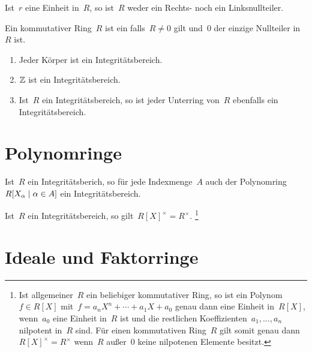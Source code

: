 \begin{proposition}
  Ist~$r$ eine Einheit in~$R$, so ist~$R$ weder ein Rechts- noch ein Linksnullteiler.
\end{proposition}

\begin{definition}
  Ein kommutativer Ring~$R$ ist ein  falls~$R \neq 0$ gilt und~$0$ der einzige Nullteiler in~$R$ ist.
\end{definition}

\begin{example}
  \leavevmode
  \begin{enumerate}
    \item
      Jeder Körper ist ein Integritätsbereich.
    \item
      $\mathbb{Z}$ ist ein Integritätsbereich.
    \item
      Ist~$R$ ein Integritätsbereich, so ist jeder Unterring von~$R$ ebenfalls ein Integritätsbereich.
  \end{enumerate}
\end{example}





\section{Polynomringe}

\begin{proposition}
  Ist~$R$ ein Integritätsberich, so für jede Indexmenge~$A$ auch der Polynomring~$R[X_\alpha \suchthat \alpha \in A]$ ein Integritätsbereich.
\end{proposition}

\begin{proposition}
  Ist~$R$ ein Integritätsbereich, so gilt~$R[X]^\times = R^\times$.%
  \footnote{
    Ist allgemeiner~$R$ ein beliebiger kommutativer Ring, so ist ein Polynom~$f \in R[X]$ mit~$f = a_n X^n + \dotsb + a_1 X + a_0$ genau dann eine Einheit in~$R[X]$, wenn~$a_0$ eine Einheit in~$R$ ist und die restlichen Koeffizienten~$a_1, \dotsc, a_n$ nilpotent in~$R$ sind.
    Für einen kommutativen Ring~$R$ gilt somit genau dann~$R[X]^\times = R^\times$ wenn~$R$ außer~$0$ keine nilpotenen Elemente besitzt.
  }
  
\end{proposition}





\section{Ideale und Faktorringe}



